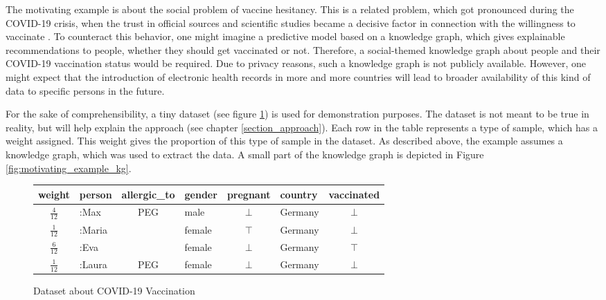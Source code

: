The motivating example is about the social problem of vaccine hesitancy. This is a related problem, which got pronounced during the COVID-19 crisis, when the trust in official sources and scientific studies became a decisive factor in connection with the willingness to vaccinate \cite{petravic2021factors}. To counteract this behavior, one might imagine a predictive model based on a knowledge graph, which gives explainable recommendations to people, whether they should get vaccinated or not. Therefore, a social-themed knowledge graph about people and their COVID-19 vaccination status would be required. Due to privacy reasons, such a knowledge graph is not publicly available. However, one might expect that the introduction of electronic health records in more and more countries \cite{essen2018patient} will lead to broader availability of this kind of data to specific persons in the future. 
    
For the sake of comprehensibility, a tiny dataset (see figure \ref{fig:motivating_dataset}) is used for demonstration purposes. The dataset is not meant to be true in reality, but will help explain the approach (see chapter \ref{section_approach}). Each row in the table represents a type of sample, which has a weight assigned. This weight gives the proportion of this type of sample in the dataset. As described above, the example assumes a knowledge graph, which was used to extract the data. A small part of the knowledge graph is depicted in Figure \ref{fig:motivating_example_kg}. 
    
    \begin{figure}
        \centering
        \begin{tabular}{c|lclclc}
            \toprule
            weight & person & allergic\_to & gender & pregnant & country & vaccinated\\
            \midrule
            \midrule
            \(\frac{4}{12}\) & :Max & PEG & male & \(\bot\) & Germany & \(\bot\) \\
            \(\frac{1}{12}\) & :Maria & & female & \(\top\) & Germany & \(\bot\) \\
            \(\frac{6}{12}\) & :Eva   & & female & \(\bot\) & Germany & \(\top\) \\
            \(\frac{1}{12}\) & :Laura & PEG & female & \(\bot\) & Germany & \(\bot\) \\
            \bottomrule
        \end{tabular}
        \caption{Dataset about COVID-19 Vaccination}
        \label{fig:motivating_dataset}
    \end{figure}
    
